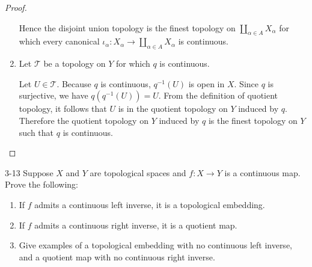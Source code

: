 \begin{proof}
\begin{enumerate}[label={(\alph*)}]
              Hence the disjoint union topology is the finest topology on $\coprod_{\alpha\in A}X_{\alpha}$ for which every canonical $\iota_{\alpha}: X_{\alpha}\to \coprod_{\alpha\in A}X_{\alpha}$ is continuous.
        \item Let $\mathscr{T}$ be a topology on $Y$ for which $q$ is continuous.

              Let $U \in \mathscr{T}$. Because $q$ is continuous, $q^{-1}(U)$ is open in $X$. Since $q$ is surjective, we have $q(q^{-1}(U)) = U$. From the definition of quotient topology, it follows that $U$ is in the quotient topology on $Y$ induced by $q$. Therefore the quotient topology on $Y$ induced by $q$ is the finest topology on $Y$ such that $q$ is continuous.
    \end{enumerate}
\end{proof}

\begin{problem}{3-13}
Suppose $X$ and $Y$ are topological spaces and $f: X \to Y$ is a continuous map. Prove the following:
\begin{enumerate}[label={(\alph*)}]
    \item If $f$ admits a continuous left inverse, it is a topological embedding.
    \item If $f$ admits a continuous right inverse, it is a quotient map.
    \item Give examples of a topological embedding with no continuous left inverse, and a quotient map with no continuous right inverse.
\end{enumerate}
\end{problem}

